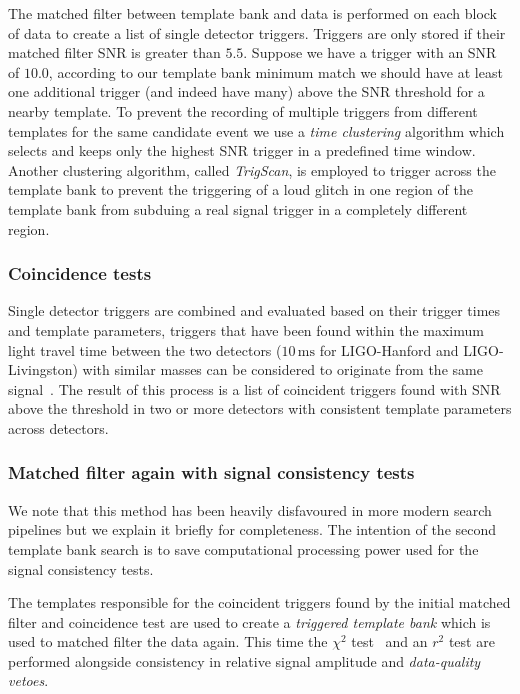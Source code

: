 The matched filter between template bank and data is performed on each block of data to create a list of single detector triggers. Triggers are only stored if their matched filter SNR is greater than $5.5$. Suppose we have a trigger with an SNR of $10.0$, according to our template bank minimum match we should have at least one additional trigger (and indeed have many) above the SNR threshold for a nearby template. To prevent the recording of multiple triggers from different templates for the same candidate event we use a \textit{time clustering} algorithm which selects and keeps only the highest SNR trigger in a predefined time window. Another clustering algorithm, called \textit{TrigScan}, is employed to trigger across the template bank to prevent the triggering of a loud glitch in one region of the template bank from subduing a real signal trigger in a completely different region.

\subsubsection{Coincidence tests}

Single detector triggers are combined and evaluated based on their trigger times and template parameters, triggers that have been found within the maximum light travel time between the two detectors ($10 \, \text{ms}$ for LIGO-Hanford and LIGO-Livingston) with similar masses can be considered to originate from the same \gwadj signal~\cite{Robinson:2008}. The result of this process is a list of coincident triggers found with SNR above the threshold in two or more detectors with consistent template parameters across detectors.

\subsubsection{Matched filter again with signal consistency tests}

We note that this method has been heavily disfavoured in more modern search pipelines but we explain it briefly for completeness. The intention of the second template bank search is to save computational processing power used for the signal consistency tests.

The templates responsible for the coincident triggers found by the initial matched filter and coincidence test are used to create a \textit{triggered template bank} which is used to matched filter the data again. This time the $\chi^{2}$ test~\cite{Allen_Chi:2005} and an $r^{2}$ test are performed alongside consistency in relative signal amplitude and \textit{data-quality vetoes}.

